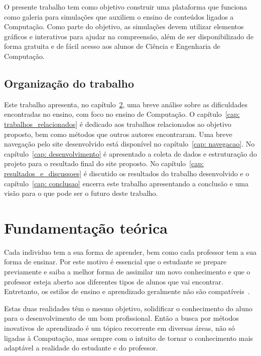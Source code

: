 \documentclass[tcc,capa]{texufpel}
\begin{document}
O presente trabalho tem como objetivo construir uma plataforma que funciona como galeria para simulações que auxiliem o ensino de conteúdos ligados a Computação. Como parte do objetivo, as simulações devem utilizar elementos gráficos e interativos para ajudar na compreensão, além de ser disponibilizado de forma gratuita e de fácil acesso aos alunos de Ciência e Engenharia de Computação.

\section{Organização do trabalho}

Este trabalho apresenta, no capítulo~\ref{cap: fundamentacao_teorica}, uma breve análise sobre as dificuldades encontradas no ensino, com foco no ensino de Computação. O capítulo~\ref{cap: trabalhos_relacionados} é dedicado aos trabalhos relacionados ao objetivo proposto, bem como métodos que outros autores encontraram. Uma breve navegação pelo site desenvolvido está disponível no capítulo~\ref{cap: navegacao}. No capítulo~\ref{cap: desenvolvimento} é apresentado a coleta de dados e estruturação do projeto para o resultado final do site proposto. No capítulo~\ref{cap: resultados_e_discussoes} é discutido os resultados do trabalho desenvolvido e o capítulo~\ref{cap: conclusao} encerra este trabalho apresentando a conclusão e uma visão para o que pode ser o futuro deste trabalho.

\chapter{Fundamentação teórica}
\label{cap: fundamentacao_teorica}

Cada individuo tem a sua forma de aprender, bem como cada professor tem a sua forma de ensinar. Por este motivo é essencial que o estudante se prepare previamente e saiba a melhor forma de assimilar um novo conhecimento e que o professor esteja aberto aos diferentes tipos de alunos que vai encontrar. Entretanto, os estilos de ensino e aprendizado geralmente não são compatíveis~\cite{felder1988learning}.

Estas duas realidades têm o mesmo objetivo, solidificar o conhecimento do aluno para o desenvolvimento de um bom profissional. Então a busca por métodos inovativos de aprendizado é um tópico recorrente em diversas áreas, não só ligadas à Computação, mas sempre com o intuito de tornar o conhecimento mais adaptável a realidade do estudante e do professor. 
\end{document}
